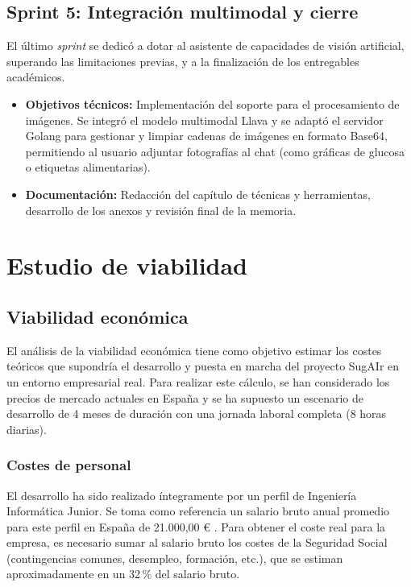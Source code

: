 \subsection*{Sprint 5: Integración multimodal y cierre}
El último \textit{sprint} se dedicó a dotar al asistente de capacidades de visión artificial, superando las limitaciones previas, y a la finalización de los entregables académicos.
\begin{itemize}
    \item \textbf{Objetivos técnicos:} Implementación del soporte para el procesamiento de imágenes. Se integró el modelo multimodal Llava y se adaptó el servidor Golang para gestionar y limpiar cadenas de imágenes en formato Base64, permitiendo al usuario adjuntar fotografías al chat (como gráficas de glucosa o etiquetas alimentarias).
    \item \textbf{Documentación:} Redacción del capítulo de técnicas y herramientas, desarrollo de los anexos y revisión final de la memoria.
\end{itemize}

\section{Estudio de viabilidad}

\subsection{Viabilidad económica}
El análisis de la viabilidad económica tiene como objetivo estimar los costes teóricos que supondría el desarrollo y puesta en marcha del proyecto SugAIr en un entorno empresarial real. Para realizar este cálculo, se han considerado los precios de mercado actuales en España y se ha supuesto un escenario de desarrollo de 4 meses de duración con una jornada laboral completa (8 horas diarias).

\subsubsection*{Costes de personal}
El desarrollo ha sido realizado íntegramente por un perfil de Ingeniería Informática Junior. Se toma como referencia un salario bruto anual promedio para este perfil en España de 21.000,00 \euro{} \cite{glassdoor_salary}. Para obtener el coste real para la empresa, es necesario sumar al salario bruto los costes de la Seguridad Social (contingencias comunes, desempleo, formación, etc.), que se estiman aproximadamente en un 32\,\% del salario bruto.

